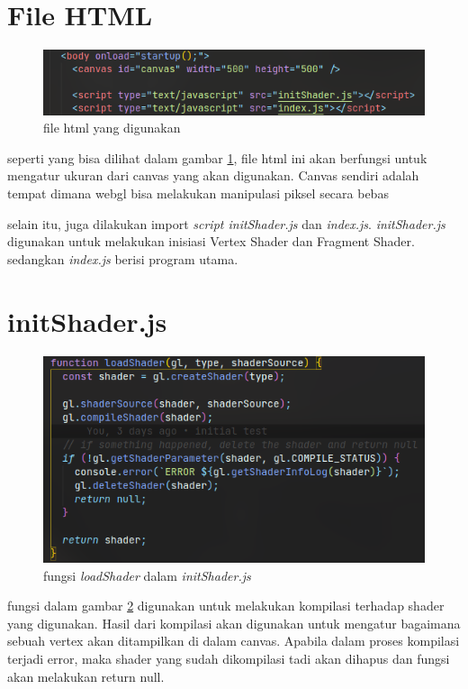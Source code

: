 \section{File HTML}

\begin{figure}[h]
    \includegraphics[width= \textwidth]{grafika/html.png}
    \caption{file html yang digunakan}
    \label{fig:html}
\end{figure}

seperti yang bisa dilihat dalam gambar \ref{fig:html}, file html ini akan berfungsi untuk mengatur ukuran dari canvas yang akan digunakan.
Canvas sendiri adalah tempat dimana webgl bisa melakukan manipulasi piksel secara bebas

selain itu, juga dilakukan import \emph{script initShader.js} dan \emph{index.js}.
\emph{initShader.js} digunakan untuk melakukan inisiasi Vertex Shader dan Fragment Shader.
sedangkan \emph{index.js} berisi program utama.



\section{initShader.js}

\begin{figure}[h]
    \includegraphics[width = \textwidth]{grafika/loadShader.png}
    \caption{fungsi \emph{loadShader} dalam \emph{initShader.js}}
    \label{fig: loadShader}
\end{figure}

fungsi dalam gambar \ref{fig: loadShader} digunakan untuk melakukan
kompilasi terhadap shader yang digunakan. Hasil dari kompilasi akan
digunakan untuk mengatur bagaimana sebuah vertex akan ditampilkan
di dalam canvas. Apabila dalam proses kompilasi terjadi error, maka
shader yang sudah dikompilasi tadi akan dihapus dan fungsi akan melakukan
return null.

